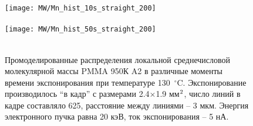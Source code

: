 \begin{figure}[h]
	\begin{center}
		\texttt{[image: MW/Mn\_hist\_10s\_straight\_200]} \\
		\vspace{-3.7em}  \vspace{2.7em} \\
		\texttt{[image: MW/Mn\_hist\_50s\_straight\_200]} \\
		\vspace{-3.7em}  \vspace{3.7em} \\
	\end{center}
	\vspace{-2.5em}
	\caption{Промоделированные распределения локальной среднечисловой молекулярной массы PMMA 950К A2 в различные моменты времени экспонирования при температуре 130~$^\circ$C. Экспонирование производилось ``в кадр'' с размерами 2.4$\times$1.9 мм$^\text{2}$, число линий в кадре составляло 625, расстояние между линиями -- 3 мкм. Энергия электронного пучка равна 20 кэВ, ток экспонирования -- 5 нА.}
	\label{fig:Mn_hist}
\end{figure}
